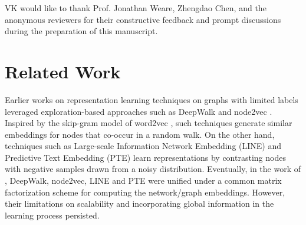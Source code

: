 \documentclass{article}
\theoremstyle{plain}
\theoremstyle{definition}
\theoremstyle{remark}
\begin{document}
VK would like to thank Prof. Jonathan Weare, Zhengdao Chen,  and the anonymous reviewers for their constructive feedback and prompt discussions during the preparation of this manuscript.












\newpage
\appendix
\onecolumn

\section{Related Work}
\label{app:related_work}

Earlier works on representation learning techniques on graphs with limited labels leveraged exploration-based approaches such as DeepWalk \citep{perozzi2014deepwalk} and node2vec \citep{grover2016node2vec}. Inspired by the skip-gram model of word2vec \citep{mikolov2013efficient}, such techniques generate similar embeddings for nodes that co-occur in a random walk. On the other hand, techniques such as Large-scale Information Network Embedding (LINE) \citep{tang2015line} and Predictive Text Embedding (PTE) \citep{tang2015pte} learn representations by contrasting nodes with negative samples drawn from a noisy distribution. Eventually, in the work of \citet{qiu2018network}, DeepWalk, node2vec, LINE and PTE were unified under a common matrix factorization scheme for computing the network/graph embeddings. However, their limitations on scalability and incorporating global information in the learning process persisted.
\end{document}
